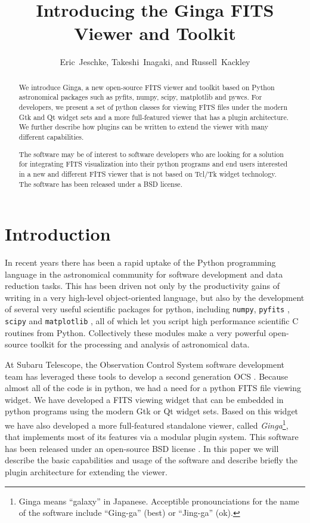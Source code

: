 
\resetcounters




\title{Introducing the Ginga FITS Viewer and Toolkit}
\author{Eric~Jeschke, Takeshi~Inagaki, and Russell~Kackley
}


\begin{abstract}
We introduce Ginga, a new open-source FITS
viewer and toolkit based on Python astronomical packages such as pyfits,
numpy, scipy, matplotlib and pywcs.  For developers, we present a set of
python classes for viewing FITS files under the modern Gtk and Qt widget
sets and a more  full-featured viewer that has a plugin architecture.
We further describe how plugins can be written to extend the viewer with
many different capabilities.  

The software may be of interest to software developers who are
looking for a solution for integrating FITS visualization into their
python programs and end users interested in a new and different FITS
viewer that is not based on Tcl/Tk widget technology.  The software has
been released under a BSD license.
\end{abstract}

\section{Introduction}
In recent years there has been a rapid uptake of the Python
programming language in the astronomical community for software
development and data reduction tasks.
This has been driven not only by the productivity gains of writing in a
very high-level object-oriented language, but also by the development of
several very useful scientific packages for python, including 
{\tt numpy}, {\tt pyfits} \citep{Barrett99}, {\tt scipy} and 
{\tt matplotlib} \citep{matplotlib}, all of which let you script high
performance scientific C routines from Python. 
Collectively these modules make a very powerful open-source toolkit for the
processing and analysis of astronomical data.

At Subaru Telescope, the Observation Control System software development
team has leveraged these tools to develop a second generation
OCS \citep{Jeschke10B}.  
Because almost all of the code is in python, we had a need for a python
FITS file viewing widget.  We have developed a FITS viewing widget that
can be embedded in python programs using the modern Gtk or Qt widget
sets.
Based on this widget we have also developed a more full-featured
standalone viewer, called \emph{Ginga}\footnote{Ginga means ``galaxy''
  in Japanese. Acceptible pronounciations for the name of the software
  include ``Ging-ga'' (best) or ``Jing-ga'' (ok).}, 
that implements most of its features via a modular plugin system.
This software has been released under an open-source BSD
license \citep{Jeschke12}.
In this paper we will describe the basic capabilities and usage of the
software and describe briefly the plugin architecture for extending the
viewer.

